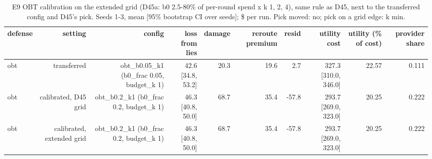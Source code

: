 \begin{table}[t]
\centering
\small
\caption{E9 OBT calibration on the extended grid (D45a: b0 2.5-80\% of per-round spend x k 1, 2, 4), same rule as D45, next to the transferred config and D45's pick. Seeds 1-3, mean [95\% bootstrap CI over seeds]; \$ per run. Pick moved: no; pick on a grid edge: k min.}
\label{tab:e9_calibration_ext}
\begin{tabular}{lrrrrrrrrr}
\toprule
defense & setting & config & loss from lies & damage & reroute premium & resid & utility cost & utility (\% of cost) & provider share \\
\midrule
obt & transferred & obt\_b0.05\_k1 (b0\_frac 0.05, budget\_k 1) & 42.6 [34.8, 53.2] & 20.3 & 19.6 & 2.7 & 327.3 [310.0, 346.0] & 22.57 & 0.111 \\
obt & calibrated, D45 grid & obt\_b0.2\_k1 (b0\_frac 0.2, budget\_k 1) & 46.3 [40.8, 50.0] & 68.7 & 35.4 & -57.8 & 293.7 [269.0, 323.0] & 20.25 & 0.222 \\
obt & calibrated, extended grid & obt\_b0.2\_k1 (b0\_frac 0.2, budget\_k 1) & 46.3 [40.8, 50.0] & 68.7 & 35.4 & -57.8 & 293.7 [269.0, 323.0] & 20.25 & 0.222 \\
\bottomrule
\end{tabular}
\end{table}
